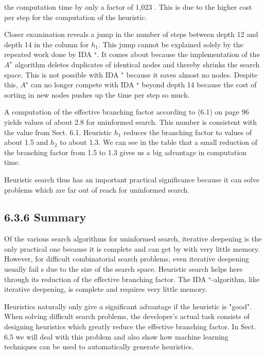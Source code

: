 \documentclass[10pt]{article}
\begin{document}
the computation time by only a factor of 1,023 . This is due to the higher cost per step for the computation of the heuristic.

Closer examination reveals a jump in the number of steps between depth 12 and depth 14 in the column for $h_{1}$. This jump cannot be explained solely by the repeated work done by IDA ${ }^{\star}$. It comes about because the implementation of the $A^{\star}$ algorithm deletes duplicates of identical nodes and thereby shrinks the search space. This is not possible with IDA ${ }^{\star}$ because it saves almost no nodes. Despite this, $A^{\star}$ can no longer compete with IDA ${ }^{\star}$ beyond depth 14 because the cost of sorting in new nodes pushes up the time per step so much.

A computation of the effective branching factor according to (6.1) on page 96 yields values of about 2.8 for uninformed search. This number is consistent with the value from Sect. 6.1. Heuristic $h_{1}$ reduces the branching factor to values of about 1.5 and $h_{2}$ to about 1.3. We can see in the table that a small reduction of the branching factor from 1.5 to 1.3 gives us a big advantage in computation time.

Heuristic search thus has an important practical significance because it can solve problems which are far out of reach for uninformed search.

\subsection*{6.3.6 Summary}
Of the various search algorithms for uninformed search, iterative deepening is the only practical one because it is complete and can get by with very little memory. However, for difficult combinatorial search problems, even iterative deepening usually fail
s due to the size of the search space. Heuristic search helps here through its reduction of the effective branching factor. The IDA ${ }^{\star}$-algorithm, like iterative deepening, is complete and requires very little memory.

Heuristics naturally only give a significant advantage if the heuristic is "good". When solving difficult search problems, the developer's actual task consists of designing heuristics which greatly reduce the effective branching factor. In Sect. 6.5 we will deal with this problem and also show how machine learning techniques can be used to automatically generate heuristics.
\end{document}
